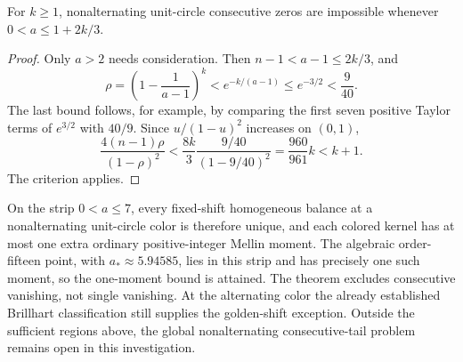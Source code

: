 \begin{corollary}
\label{stex:linear}
For $k\ge1$, nonalternating unit-circle consecutive zeros are impossible
whenever $0<a\le1+2k/3$.
\end{corollary}
\begin{proof}
Only $a>2$ needs consideration.  Then $n-1<a-1\le2k/3$, and
\[
 \rho=\left(1-\frac1{a-1}\right)^k
       <e^{-k/(a-1)}\le e^{-3/2}<\frac9{40}.
\]
The last bound follows, for example, by comparing the first seven
positive Taylor terms of $e^{3/2}$ with $40/9$.
Since $u/(1-u)^2$ increases on $(0,1)$,
\[
 \frac{4(n-1)\rho}{(1-\rho)^2}
       <\frac{8k}{3}\frac{9/40}{(1-9/40)^2}
       =\frac{960}{961}k<k+1.
\]
The criterion applies.
\end{proof}

On the strip $0<a\le7$, every fixed-shift homogeneous balance at a
nonalternating unit-circle color is therefore unique, and each colored
kernel has at most one extra ordinary positive-integer Mellin moment.
The algebraic order-fifteen point, with $a_*\approx5.94585$, lies in
this strip and has precisely one such moment, so the one-moment bound
is attained.  The theorem excludes consecutive vanishing, not single
vanishing.  At the alternating color the already established Brillhart
classification still supplies the golden-shift exception.
Outside the sufficient regions above, the global nonalternating
consecutive-tail problem remains open in this investigation.
